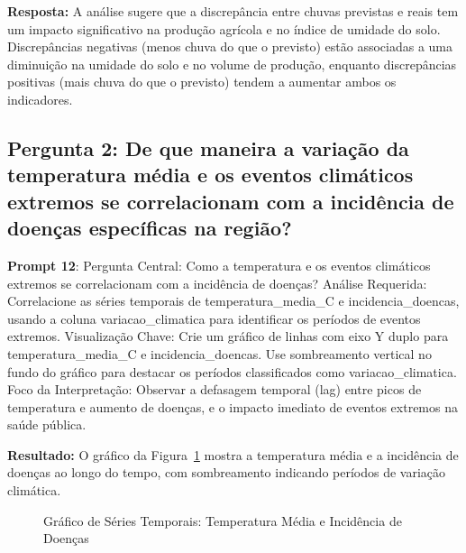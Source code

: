 \documentclass[12pt, a4paper, onecolumn]{article}
\begin{document}
    \textbf{Resposta:} A análise sugere que a discrepância entre chuvas previstas e reais tem um impacto significativo na produção agrícola e no índice de umidade do solo. Discrepâncias negativas (menos chuva do que o previsto) estão associadas a uma diminuição na umidade do solo e no volume de produção, enquanto discrepâncias positivas (mais chuva do que o previsto) tendem a aumentar ambos os indicadores.

    \subsection*{Pergunta 2: De que maneira a variação da temperatura média e os eventos climáticos extremos se correlacionam com a incidência de doenças específicas na região?}
    \textbf{Prompt 12}: Pergunta Central: Como a temperatura e os eventos climáticos extremos se correlacionam com a incidência de doenças?
    Análise Requerida: Correlacione as séries temporais de temperatura\_media\_C e incidencia\_doencas, usando a coluna variacao\_climatica para identificar os períodos de eventos extremos.
    Visualização Chave: Crie um gráfico de linhas com eixo Y duplo para temperatura\_media\_C e incidencia\_doencas. Use sombreamento vertical no fundo do gráfico para destacar os períodos classificados como variacao\_climatica.
    Foco da Interpretação: Observar a defasagem temporal (lag) entre picos de temperatura e aumento de doenças, e o impacto imediato de eventos extremos na saúde pública.
    \vspace{0.5cm}

    \textbf{Resultado:} O gráfico da Figura~\ref{fig:serie_temporal_temperatura_doencas} mostra a temperatura média e a incidência de doenças ao longo do tempo, com sombreamento indicando períodos de variação climática.
    \vspace{0.5cm}
    
    \begin{figure}[htbp]
        \centering
        \caption{Gráfico de Séries Temporais: Temperatura Média e Incidência de Doenças}
        \label{fig:serie_temporal_temperatura_doencas}
    \end{figure}
    
\end{document}
